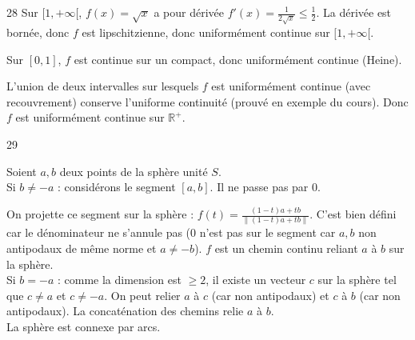 \begin{correction}{28}
Sur $[1, +\infty[$, $f(x) = \sqrt{x}$ a pour dérivée $f'(x) = \frac{1}{2\sqrt{x}} \le \frac{1}{2}$.
La dérivée est bornée, donc $f$ est lipschitzienne, donc uniformément continue sur $[1, +\infty[$.

Sur $[0, 1]$, $f$ est continue sur un compact, donc uniformément continue (Heine).

L'union de deux intervalles sur lesquels $f$ est uniformément continue (avec recouvrement) conserve l'uniforme continuité (prouvé en exemple du cours).
Donc $f$ est uniformément continue sur $\mathbb{R}^{+}$.
\end{correction}

\begin{correction}{29}

Soient $a, b$ deux points de la sphère unité $S$. \\

Si $b \neq -a$ :
considérons le segment $[a,b]$. Il ne passe pas par 0.

On projette ce segment sur la sphère : $f(t) = \frac{(1-t)a + tb}{\|(1-t)a + tb\|}$.
C'est bien défini car le dénominateur ne s'annule pas ($0$ n'est pas sur le segment car $a, b$ non antipodaux de même norme et $a \neq -b$).
$f$ est un chemin continu reliant $a$ à $b$ sur la sphère. \\

Si $b = -a$ :
comme la dimension est $\ge 2$, il existe un vecteur $c$ sur la sphère tel que $c \neq a$ et $c \neq -a$.
On peut relier $a$ à $c$ (car non antipodaux) et $c$ à $b$ (car non antipodaux).
La concaténation des chemins relie $a$ à $b$. \\

La sphère est connexe par arcs.
\end{correction}

